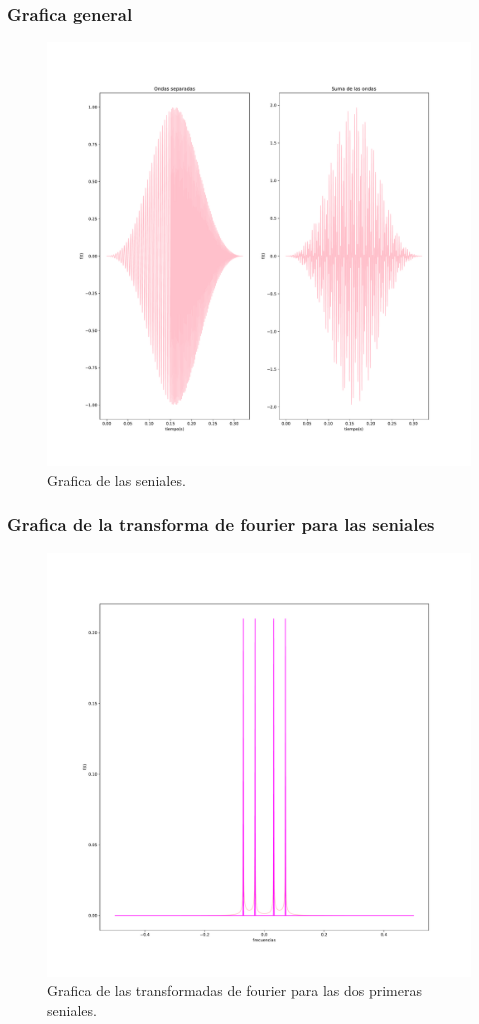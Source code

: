 \documentclass[11pt,letterpaper]{exam}
\begin{document}
\subsubsection{Grafica general}
\begin{figure}[H]
    \centering
    \includegraphics[width=1.1\textwidth]{signals.pdf}
    \caption{Grafica de las seniales.}
    \label{fig:my_label}
\end{figure}
\subsubsection{Grafica de la transforma de fourier para las seniales}
\begin{figure}[H]
    \centering
    \includegraphics[width=1.1\textwidth]{Fourier_trans.pdf}
    \caption{Grafica de las transformadas de fourier para las dos primeras seniales.}
    \label{fig:my_label}
\end{figure}
\end{document}
